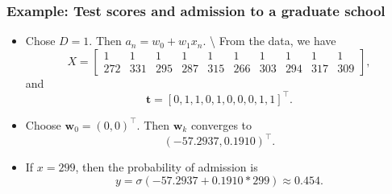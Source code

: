 \documentclass[
]{article}
\begin{document}
\hypertarget{example-test-scores-and-admission-to-a-graduate-school}{%
\subsubsection{Example: Test scores and admission to a graduate
school}\label{example-test-scores-and-admission-to-a-graduate-school}}

\begin{itemize}
\item
  Chose \(D=1\). Then \(a_n=w_0+w_1x_n\). \textbackslash{} From the
  data, we have \[X= \begin{bmatrix}  1 &1 &1 &1 &1 &1 &1 &1 &1 &1 \\
  272&331&295&287&315&266&303&294&317&309 \end{bmatrix}, \] and
  \[ \mathbf{t}=[0,1,1,0,1,0,0,0,1,1]^\top .\]
\item
  Choose \({\boldsymbol{w}}_0=(0,0)^\top\). Then \({\boldsymbol{w}}_k\)
  converges to \[ (-57.2937, 0.1910)^\top .\]
\item
  If \(x=299\), then the probability of admission is
  \[ y= \sigma(-57.2937+ 0.1910*299) \approx 0.454 .\]
\end{itemize}
\end{document}
